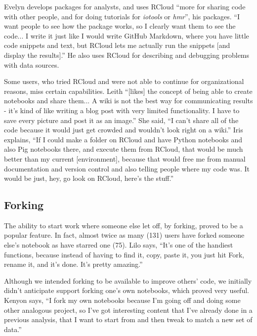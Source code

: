 Evelyn develops packages for analysts, and uses RCloud ``more for sharing code with
other people, and for doing tutorials for {\em iotools} or {\em hmr}'', his packages.
``I want people to see how the package works, so I clearly want them
to see the code... I write it just like I would write GitHub
Markdown, where you have little code snippets and text, but RCloud lets me
actually run the snippets [and display the results].'' He also uses RCloud for
describing and debugging  problems with data sources.

Some users, who tried RCloud and were not able to continue for organizational
reasons, miss certain capabilities. Leith ``[likes] the concept of being
able to create notebooks and share them... A wiki is not the best way for
communicating results - it's kind of like writing a blog post with very limited
functionality. I have to save every picture and post it as an image.'' She said,
``I can't share all of the code because it would just get crowded and wouldn't
look right on a wiki.'' Iris explains, ``If I could make a folder on RCloud and
have Python notebooks and also Pig notebooks there, and execute them from RCloud,
that would be much better than my current [environment], because that would free
me from manual documentation and version control and also telling people where
my code was. It would be just, hey, go look on RCloud, here's the stuff.''



\subsection{Forking}
The ability to start work where someone else let off, by forking, proved to
be a popular feature. In fact, almost twice as many (131) users have forked
someone else's notebook as have starred one (75).  Lilo says, ``It's one of the
handiest functions, because instead of having to find it, copy, paste it, you
just hit Fork, rename it, and it's done. It's pretty amazing.''

Although we intended forking to be available to improve others' code, we 
initially didn't anticipate support forking one's own notebooks, which
proved very useful. Kenyon says, ``I fork my own notebooks because I'm going off
and doing some other analogous project, so I've got interesting content that I've
already done in a previous analysis, that I want to start from and then tweak
to match a new set of data.''


